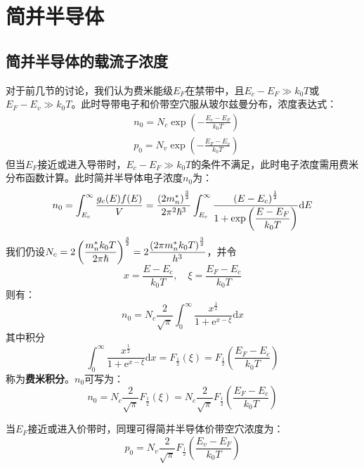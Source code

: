 \section{简并半导体}

\subsection{简并半导体的载流子浓度}

对于前几节的讨论，我们认为费米能级$E_F$在禁带中，且$E_c-E_F\gg k_0T$或$E_F-E_v\gg k_0T$。此时导带电子和价带空穴服从玻尔兹曼分布，浓度表达式：
\begin{align}
    &n_0=N_c\exp{\left(-\frac{E_c-E_F}{k_0T}\right)}\\
    &p_0=N_v\exp{\left(-\frac{E_F-E_v}{k_0T}\right)}
\end{align}
但当$E_F$接近或进入导带时，$E_c-E_F\gg k_0T$的条件不满足，此时电子浓度需用费米分布函数计算。此时简并半导体电子浓度$n_0$为：
\begin{equation}
    n_0=\int_{E_c}^\infty\frac{g_c(E)f(E)}{V}=\frac{\left(2m_n^*\right)^\frac{3}{2}}{2\pi^2\hslash^3}\int_{E_c}^\infty\frac{\left(E-E_c\right)^\frac{1}{2}}{\displaystyle 1+\exp{\left(\frac{E-E_F}{k_0T}\right)}}\mathrm{d}E
\end{equation}
\vspace{1ex}我们仍设$\displaystyle N_c=2\left(\frac{m_n^*k_0T}{2\pi\hslash}\right)^\frac{3}{2}=2\frac{\left(2\pi m_n^*k_0T\right)^\frac{3}{2}}{h^3}$，并令
\begin{equation}
    x=\frac{E-E_c}{k_0T},\quad \xi=\frac{E_F-E_c}{k_0T}
\end{equation}
则有：
\begin{equation}
    n_0=N_c\frac{2}{\sqrt{\pi}}\int_0^\infty\frac{x^\frac{1}{2}}{1+\mathrm{e}^{x-\xi}}\mathrm{d}x
\end{equation}
其中积分
\begin{equation}
    \int_0^\infty\frac{x^\frac{1}{2}}{1+\mathrm{e}^{x-\xi}}\mathrm{d}x=F_\frac{1}{2}(\xi)=F_\frac{1}{2}\left(\frac{E_F-E_c}{k_0T}\right)
\end{equation}
称为\textbf{费米积分}。$n_0$可写为：
\begin{equation}
    n_0=N_c\frac{2}{\sqrt{\pi}}F_\frac{1}{2}(\xi)=N_c\frac{2}{\sqrt{\pi}}F_\frac{1}{2}\left(\frac{E_F-E_c}{k_0T}\right)
\end{equation}

当$E_F$接近或进入价带时，同理可得简并半导体价带空穴浓度为：
\begin{equation}
    p_0=N_v\frac{2}{\sqrt{\pi}}F_\frac{1}{2}\left(\frac{E_v-E_F}{k_0T}\right)
\end{equation}


